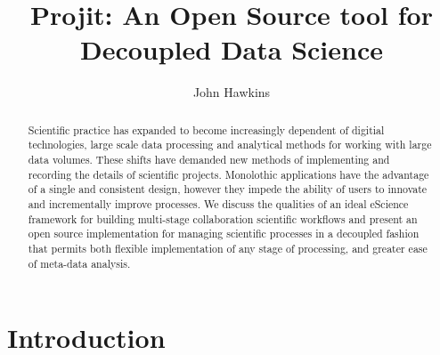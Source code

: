 \documentclass[sigconf]{acmart}
\begin{document}
\title{Projit: An Open Source tool for Decoupled Data Science}

\author{John Hawkins}

\renewcommand{\shortauthors}{Hawkins}

\begin{abstract} 
Scientific practice has expanded to become increasingly dependent of digitial technologies,
large scale data processing and analytical methods for working with large data volumes. 
These shifts have demanded new methods of implementing and recording the details of 
scientific projects. Monolothic applications have the advantage of a single and 
consistent design, however they impede the ability of users to innovate and 
incrementally improve processes. We discuss the qualities of an ideal eScience 
framework for building multi-stage collaboration scientific workflows and present 
an open source implementation for managing scientific processes in a decoupled 
fashion that permits both flexible implementation of any stage of processing, 
and greater ease of meta-data analysis.
\end{abstract}



\maketitle

\section{Introduction}
\end{document}
